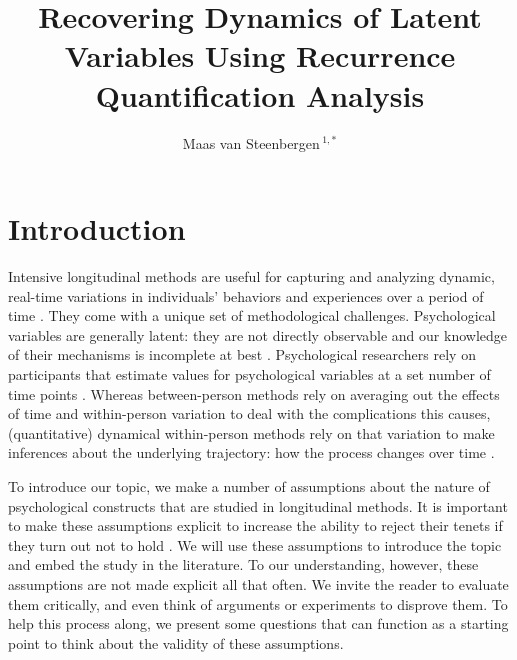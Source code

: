 \documentclass[utf8]{FrontiersinVancouver}
\def\firstAuthorLast{van Steenbergen} %
\def\Authors{Maas van Steenbergen\,$^{1,*}$}
\begin{document}
\onecolumn
{}

\title[Recovering Dynamics Using RQA]{Recovering Dynamics of Latent Variables Using Recurrence Quantification Analysis} 

\author[\firstAuthorLast]{\Authors} %
\address{} %
\correspondance{} %

\extraAuth{}%

\maketitle


\section{Introduction}

Intensive longitudinal methods are useful for capturing and analyzing dynamic, real-time variations in individuals' behaviors and experiences over a period of time \citep{bolgerIntensiveLongitudinalMethods2013}.  They come with a unique set of methodological challenges. Psychological variables are generally latent: they are not directly observable and our knowledge of their mechanisms is incomplete at best \citep{bollenLatentVariablesPsychology2002}. Psychological researchers rely on participants that estimate values for psychological variables at a set number of time points \citep{borsboomLatentVariableTheory2008}. Whereas between-person methods rely on averaging out the effects of time and within-person variation to deal with the complications this causes, (quantitative) dynamical within-person methods rely on that variation to make inferences about the underlying trajectory: how the process changes over time \citep{bokerConsequencesContinuityHunt2002, molenaarManifestoPsychologyIdiographic2004,lamiellStatisticalThinkingPsychology2019}.

To introduce our topic, we make a number of assumptions about the nature of psychological constructs that are studied in longitudinal methods. It is important to make these assumptions explicit to increase the ability to reject their tenets if they turn out not to hold \citep{meehlTheoreticalRisksTabular2004}. We will use these assumptions to introduce the topic and embed the study in the literature. To our understanding, however, these assumptions are not made explicit all that often. We invite the reader to evaluate them critically, and even think of arguments or experiments to disprove them. To help this process along, we present some questions that can function as a starting point to think about the validity of these assumptions. 
\end{document}
